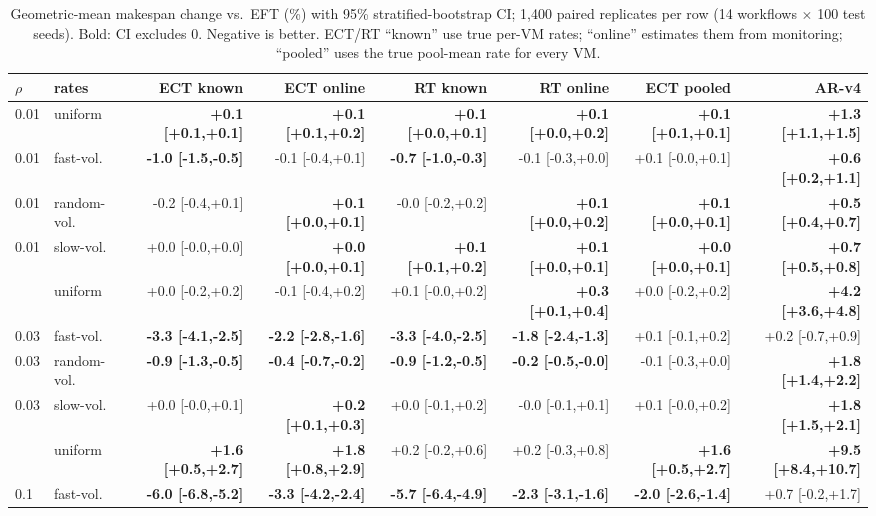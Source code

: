 \begin{table}[t]\centering\scriptsize
\caption{Geometric-mean makespan change vs.\ EFT (\%) with 95\% stratified-bootstrap CI; 1{,}400 paired replicates per row (14 workflows $\times$ 100 test seeds). Bold: CI excludes 0. Negative is better. ECT/RT ``known'' use true per-VM rates; ``online'' estimates them from monitoring; ``pooled'' uses the true pool-mean rate for every VM.}\label{tab:main}
\setlength{\tabcolsep}{3pt}\begin{tabular}{llrrrrrr}
\toprule
$\rho$ & rates & ECT known & ECT online & RT known & RT online & ECT pooled & AR-v4\\
\midrule
0.01 & uniform & \textbf{+0.1 [+0.1,+0.1]} & \textbf{+0.1 [+0.1,+0.2]} & \textbf{+0.1 [+0.0,+0.1]} & \textbf{+0.1 [+0.0,+0.2]} & \textbf{+0.1 [+0.1,+0.1]} & \textbf{+1.3 [+1.1,+1.5]}\\
0.01 & fast-vol. & \textbf{-1.0 [-1.5,-0.5]} & -0.1 [-0.4,+0.1] & \textbf{-0.7 [-1.0,-0.3]} & -0.1 [-0.3,+0.0] & +0.1 [-0.0,+0.1] & \textbf{+0.6 [+0.2,+1.1]}\\
0.01 & random-vol. & -0.2 [-0.4,+0.1] & \textbf{+0.1 [+0.0,+0.1]} & -0.0 [-0.2,+0.2] & \textbf{+0.1 [+0.0,+0.2]} & \textbf{+0.1 [+0.0,+0.1]} & \textbf{+0.5 [+0.4,+0.7]}\\
0.01 & slow-vol. & +0.0 [-0.0,+0.0] & \textbf{+0.0 [+0.0,+0.1]} & \textbf{+0.1 [+0.1,+0.2]} & \textbf{+0.1 [+0.0,+0.1]} & \textbf{+0.0 [+0.0,+0.1]} & \textbf{+0.7 [+0.5,+0.8]}\\
\addlinespace[2pt]
0.03 & uniform & +0.0 [-0.2,+0.2] & -0.1 [-0.4,+0.2] & +0.1 [-0.0,+0.2] & \textbf{+0.3 [+0.1,+0.4]} & +0.0 [-0.2,+0.2] & \textbf{+4.2 [+3.6,+4.8]}\\
0.03 & fast-vol. & \textbf{-3.3 [-4.1,-2.5]} & \textbf{-2.2 [-2.8,-1.6]} & \textbf{-3.3 [-4.0,-2.5]} & \textbf{-1.8 [-2.4,-1.3]} & +0.1 [-0.1,+0.2] & +0.2 [-0.7,+0.9]\\
0.03 & random-vol. & \textbf{-0.9 [-1.3,-0.5]} & \textbf{-0.4 [-0.7,-0.2]} & \textbf{-0.9 [-1.2,-0.5]} & \textbf{-0.2 [-0.5,-0.0]} & -0.1 [-0.3,+0.0] & \textbf{+1.8 [+1.4,+2.2]}\\
0.03 & slow-vol. & +0.0 [-0.0,+0.1] & \textbf{+0.2 [+0.1,+0.3]} & +0.0 [-0.1,+0.2] & -0.0 [-0.1,+0.1] & +0.1 [-0.0,+0.2] & \textbf{+1.8 [+1.5,+2.1]}\\
\addlinespace[2pt]
0.1 & uniform & \textbf{+1.6 [+0.5,+2.7]} & \textbf{+1.8 [+0.8,+2.9]} & +0.2 [-0.2,+0.6] & +0.2 [-0.3,+0.8] & \textbf{+1.6 [+0.5,+2.7]} & \textbf{+9.5 [+8.4,+10.7]}\\
0.1 & fast-vol. & \textbf{-6.0 [-6.8,-5.2]} & \textbf{-3.3 [-4.2,-2.4]} & \textbf{-5.7 [-6.4,-4.9]} & \textbf{-2.3 [-3.1,-1.6]} & \textbf{-2.0 [-2.6,-1.4]} & +0.7 [-0.2,+1.7]\\

\end{tabular}
\end{table}
